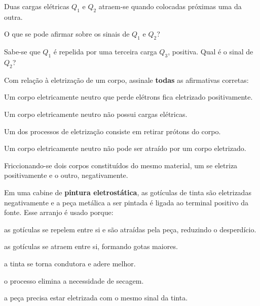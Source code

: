 \begin{questao}[1]{}

Duas cargas elétricas $Q_1$ e $Q_2$ atraem-se quando colocadas próximas uma da outra.
\begin{itensq}
\item O que se pode afirmar sobre os sinais de $Q_1$ e $Q_2$?
\item Sabe-se que $Q_1$ é repelida por uma terceira carga $Q_3$, positiva.
      Qual é o sinal de $Q_2$?
\end{itensq}


\end{questao}
\begin{questao}[1]{}

Com relação à eletrização de um corpo, assinale \textbf{todas} as afirmativas corretas:
\begin{alternativas}
\item Um corpo eletricamente neutro que perde elétrons fica eletrizado positivamente.
\item Um corpo eletricamente neutro não possui cargas elétricas.
\item Um dos processos de eletrização consiste em retirar prótons do corpo.
\item Um corpo eletricamente neutro não pode ser atraído por um corpo eletrizado.
\item Friccionando-se dois corpos constituídos do mesmo material, um se eletriza
      positivamente e o outro, negativamente.
\end{alternativas}


\end{questao}
\begin{questao}[1]{}

Em uma cabine de \textbf{pintura eletrostática}, as gotículas de tinta são
eletrizadas negativamente e a peça metálica a ser pintada é ligada ao terminal
positivo da fonte. Esse arranjo é usado porque:
\begin{alternativas}
\item as gotículas se repelem entre si e são atraídas pela peça, reduzindo o desperdício.
\item as gotículas se atraem entre si, formando gotas maiores.
\item a tinta se torna condutora e adere melhor.
\item o processo elimina a necessidade de secagem.
\item a peça precisa estar eletrizada com o mesmo sinal da tinta.
\end{alternativas}


\end{questao}
